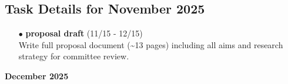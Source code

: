 \documentclass[landscape,a4paper]{article}
\begin{document}
\subsection{Task Details for November 2025}
\begin{itemize}[leftmargin=1cm]
    \item[\textcolor{researchcore}{$\bullet$}] \textbf{proposal draft} (11/15 - 12/15)\\ Write full proposal document (\textasciitilde{}13 pages) including all aims and research strategy for committee review.
\end{itemize}

\newpage
\pagestyle{empty}

\begin{center}
{\large\textbf{December 2025}}
\end{center}

\vspace{0.5cm}
\end{document}
